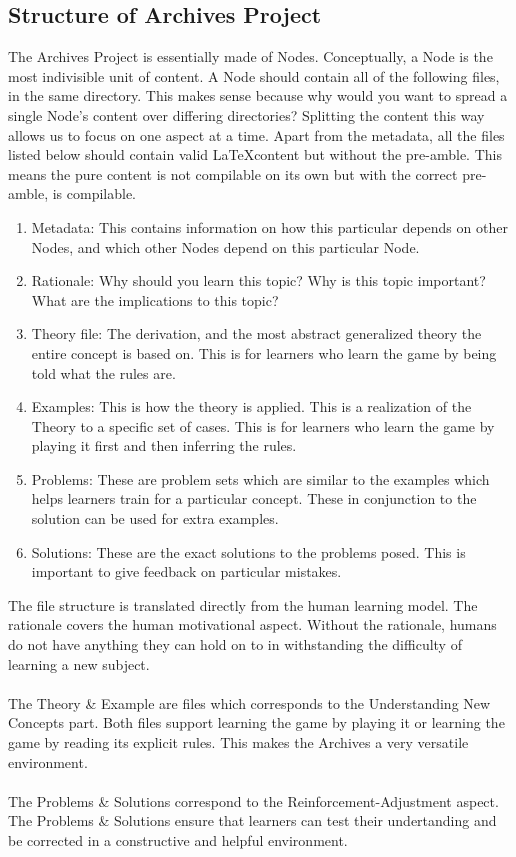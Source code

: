 \documentclass[a4paper, 12pt]{report}
\begin{document}
\begin{center}
\section{Structure of Archives Project}
\begin{comment}
\end{comment}
The Archives Project is essentially made of Nodes.
Conceptually, a Node is the most indivisible unit of content.
A Node should contain all of the following files, in the same directory.
This makes sense because why would you want to spread a single Node's content over differing directories?
Splitting the content this way allows us to focus on one aspect at a time.
Apart from the metadata, all the files listed below should contain valid \LaTeX content but without the pre-amble.
This means the pure content is not compilable on its own but with the correct pre-amble, is compilable.
\begin{enumerate}
\item Metadata: This contains information on how this particular depends on other Nodes, and which other Nodes depend on this particular Node.
\item Rationale: Why should you learn this topic? Why is this topic important? What are the implications to this topic?
\item Theory file: The derivation, and the most abstract generalized theory the entire concept is based on. This is for learners who learn the game by being told what the rules are.
\item Examples: This is how the theory is applied. This is a realization of the Theory to a specific set of cases. This is for learners who learn the game by playing it first and then inferring the rules.
\item Problems: These are problem sets which are similar to the examples which helps learners train for a particular concept. These in conjunction to the solution can be used for extra examples.
\item Solutions: These are the exact solutions to the problems posed. This is important to give feedback on particular mistakes.
\end{enumerate}
The file structure is translated directly from the human learning model.
The rationale covers the human motivational aspect. 
Without the rationale, humans do not have anything they can hold on to in withstanding the difficulty of learning a new subject.
\\~\\The Theory \& Example are files which corresponds to the Understanding New Concepts part.
Both files support learning the game by playing it or learning the game by reading its explicit rules. 
This makes the Archives a very versatile environment.
\\~\\The Problems \& Solutions correspond to the Reinforcement-Adjustment aspect.
The Problems \& Solutions ensure that learners can test their undertanding and be corrected in a constructive and helpful environment.


\end{center}
\end{document}
